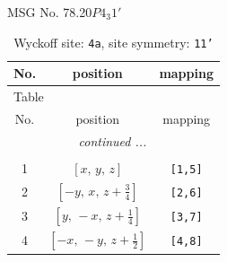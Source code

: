 \documentclass[fleqn,8pt]{jsarticle}
\begin{document}
\setcounter{MaxMatrixCols}{32}

\renewcommand{\tablename}{Table~}
\renewcommand{\figurename}{Figure~}
\begin{center}
\LARGE
MSG No. 78.20\quad$P4_{3}1'$
\end{center}
\renewcommand{\arraystretch}{1.2}
\begin{longtable}{ccc}
\caption{Wyckoff site: {\tt 4a}, site symmetry: {\tt 11'}}
 \\
 \hline \hline
No. & position & mapping \\ \hline \endfirsthead

\multicolumn{2}{l}{\tablename\ \thetable{}} \\
 \hline \hline
No. & position & mapping \\ \hline \endhead

 \hline \hline
\multicolumn{2}{r}{\footnotesize\it continued ...} \\ \endfoot

 \hline \hline
\multicolumn{2}{r}{} \\ \endlastfoot

1 & $\left[ x,\, y,\, z \right]$ & {\tt [1,5]} \\ \hline
2 & $\left[ - y,\, x,\, z + \frac{3}{4} \right]$ & {\tt [2,6]} \\ \hline
3 & $\left[ y,\, - x,\, z + \frac{1}{4} \right]$ & {\tt [3,7]} \\ \hline
4 & $\left[ - x,\, - y,\, z + \frac{1}{2} \right]$ & {\tt [4,8]} \\
\end{longtable}
\end{document}
